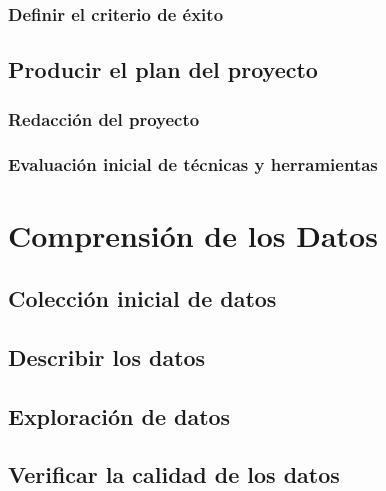\documentclass[11pt,a4paper,twoside]{tesis}
\begin{document}
\subsection{Definir el criterio de éxito}
\section{Producir el plan del proyecto}
\subsection{Redacción del proyecto}
\subsection{Evaluación inicial de técnicas y herramientas}


\chapter{Comprensión de los Datos}
\section{Colección inicial de datos}
\section{Describir los datos}
\section{Exploración de datos}
\section{Verificar la calidad de los datos}
\end{document}
